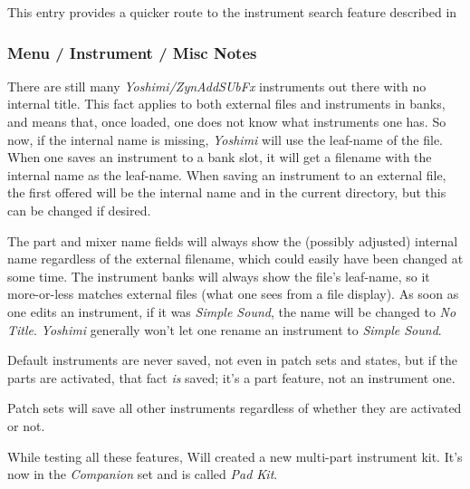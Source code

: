   This entry provides a quicker route to the instrument search feature described
   in 
\subsubsection{Menu / Instrument / Misc Notes}
\label{subsubsec:menu_instrument_misc_notes}

   There are still many \textsl{Yoshimi/ZynAddSUbFx} instruments out there with
   no internal title. This fact applies to both external files and instruments
   in banks, and means that, once loaded, one does not know what instruments
   one has. So now, if the internal name is missing, \textsl{Yoshimi} will use
   the leaf-name of the file.  When one saves an instrument to a bank slot, it
   will get a filename with the internal name as the leaf-name.  When saving
   an instrument to an external file, the first offered will be the internal
   name and in the current directory, but this can be changed if desired.

   The part and mixer name fields will always show the (possibly adjusted)
   internal name regardless of the external filename, which could easily have
   been changed at some time.  The instrument banks will always show the file's
   leaf-name, so it more-or-less matches external files (what one sees from a
   file display).  As soon as one edits an instrument, if it was \textsl{Simple
   Sound}, the name will be changed to \textsl{No Title}.  \textsl{Yoshimi}
   generally won't let one rename an instrument to \textsl{Simple Sound}.

   Default instruments are never saved, not even in patch sets and states, but
   if the parts are activated, that fact \textsl{is} saved; it's a part
   feature, not an instrument one.

   Patch sets will save all other instruments regardless of whether they are
   activated or not.

   While testing all these features, Will created a new multi-part instrument
   kit.  It's now in the \textsl{Companion} set and is called \textsl{Pad Kit}.

